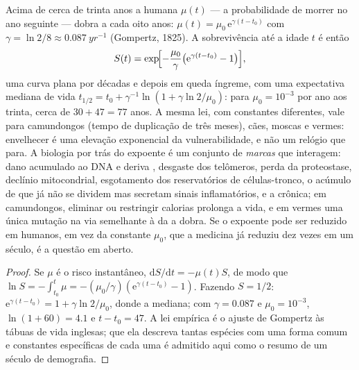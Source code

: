 \begin{proposition}\label{prop:b3:stem-cells:gompertz}
Acima de cerca de trinta anos a  humana $\mu(t)$ --- a
probabilidade de morrer no ano seguinte --- dobra a cada oito anos:
$\mu(t) =
\mu_{0}\,\mathrm{e}^{\gamma(t - t_{0})}$ com $\gamma = \ln 2/8 \approx
\qty{0.087}{yr^{-1}}$ (Gompertz, 1825). A sobrevivência até a
idade $t$ é então
\[
S(t) = \exp\!\Bigl[-\frac{\mu_{0}}{\gamma}\bigl(\mathrm{e}^{\gamma(t - t_{0})} - 1\bigr)\Bigr],
\]
uma curva plana por décadas e depois em queda íngreme, com uma
expectativa mediana de vida $t_{1/2} = t_{0} + \gamma^{-1}\ln(1 + \gamma\ln 2/\mu_{0})$: para $\mu_{0} = 10^{-3}$ por ano aos trinta,
cerca de $30 + 47 = 77$ anos. A mesma lei, com constantes diferentes,
vale para camundongos (tempo de duplicação de três meses), cães, moscas e
vermes: envelhecer é uma elevação exponencial da vulnerabilidade, e não
um relógio que para. A biologia por trás do expoente é um conjunto de
\emph{marcas} que interagem: dano acumulado ao DNA e deriva ,
desgaste dos telômeros, perda da proteostase, declínio mitocondrial,
esgotamento dos reservatórios de células-tronco, o acúmulo de
\emph{} que já não se dividem mas secretam sinais
inflamatórios, e a  crônica; em camundongos, eliminar  ou restringir calorias prolonga a vida, e em vermes uma única
mutação na via semelhante à da  a dobra. Se o expoente pode ser
reduzido em humanos, em vez da constante $\mu_{0}$, que a medicina já
reduziu dez vezes em um século, é a questão em aberto.
\end{proposition}
\begin{proof}
Se $\mu$ é o risco instantâneo, $\mathrm{d}S/\mathrm{d}t = -\mu(t)S$, de
modo que $\ln S =
-\int_{t_{0}}^{t}\mu = -(\mu_{0}/\gamma)(\mathrm{e}^{\gamma(t-t_{0})} -
1)$. Fazendo $S = 1/2$:
$\mathrm{e}^{\gamma(t-t_{0})} = 1 + \gamma\ln 2/
\mu_{0}$, donde a
mediana; com $\gamma = 0.087$ e $\mu_{0} =
10^{-3}$, $\ln(1 + 60) = 4.1$
e $t - t_{0} = 47$. A lei empírica é o ajuste de Gompertz às tábuas de
vida inglesas; que ela descreva tantas espécies com uma forma comum e
constantes específicas de cada uma é admitido aqui como o resumo de um
século de demografia.
\end{proof}

